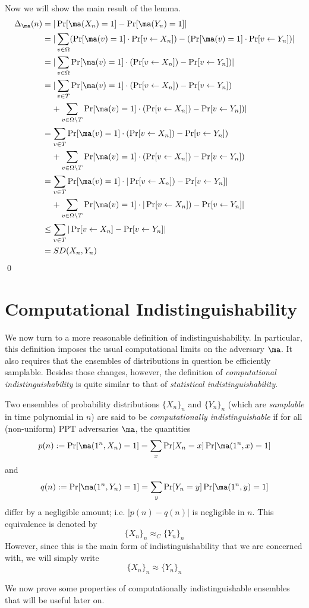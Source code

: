 Now we will show the main result of the lemma.
\begin{align*}
    \Delta_\ma(n) &= |\Pr[\ma(X_n) = 1] - \Pr[\ma(Y_n) = 1]| \\
    &= |\sum\limits_{v \in \Omega} (\Pr[\ma(v) = 1] \cdot \Pr[v \leftarrow X_n]) - (\Pr[\ma(v) = 1] \cdot \Pr[v \leftarrow Y_n])|\\
    &= |\sum\limits_{v \in \Omega} \Pr[\ma(v) = 1] \cdot ( \Pr[v \leftarrow X_n]) - \Pr[v \leftarrow Y_n])| \\
    &= |\sum\limits_{v \in T} \Pr[\ma(v) = 1] \cdot ( \Pr[v \leftarrow X_n]) - \Pr[v \leftarrow Y_n]) \\
    &\;\;\;\; + \sum\limits_{v \in \Omega \setminus T} \Pr[\ma(v) = 1] \cdot ( \Pr[v \leftarrow X_n]) - \Pr[v \leftarrow Y_n])| \\
    &= \sum\limits_{v \in T} \Pr[\ma(v) = 1] \cdot ( \Pr[v \leftarrow X_n]) - \Pr[v \leftarrow Y_n]) \\
    &\;\;\;\; + \sum\limits_{v \in \Omega \setminus T} \Pr[\ma(v) = 1] \cdot ( \Pr[v \leftarrow X_n]) - \Pr[v \leftarrow Y_n]) \\
    &= \sum\limits_{v \in T} \Pr[\ma(v) = 1] \cdot |\Pr[v \leftarrow X_n]) - \Pr[v \leftarrow Y_n]| \\
    &\;\;\;\; + \sum\limits_{v \in \Omega \setminus T} \Pr[\ma(v) = 1] \cdot |\Pr[v \leftarrow X_n]) - \Pr[v \leftarrow Y_n]| \\
    &\le \sum\limits_{v \in T} |\Pr[v \leftarrow X_n] - \Pr[v \leftarrow Y_n]|\\
    &= SD(X_n, Y_n)
\end{align*}
\qed

\section{Computational Indistinguishability}
We now turn to a more reasonable definition of indistinguishability.
In particular, this definition imposes the usual computational limits on the adversary $\ma$. 
It also requires that the ensembles of distributions in question be efficiently samplable.
Besides those changes, however, the definition of \emph{computational indistinguishability} is quite similar to that of \emph{statistical indistinguishability}.

\begin{definition}
Two ensembles of probability distributions $\{X_n\}_n$ and $\{Y_n\}_n$ (which are \emph{samplable} in time polynomial in $n$) are said to be \emph{computationally indistinguishable} if for all (non-uniform) PPT adversaries $\ma$, the quantities
$$p(n) := \Pr[\ma(1^n, X_n) = 1] = \sum_x \Pr[X_n = x]\Pr[\ma(1^n,x) = 1]$$
and
$$q(n) := \Pr[\ma(1^n,Y_n) = 1] = \sum_y \Pr[Y_n = y]\Pr[\ma(1^n,y) = 1]$$
differ by a negligible amount; i.e. $|p(n) - q(n)|$ is negligible in $n$.    
This equivalence is denoted by
$$\{X_n\}_n\approx_C \{Y_n\}_n$$
However, since this is the main form of indistinguishability that we are concerned with, we will simply write
$$\{X_n\}_n\approx \{Y_n\}_n$$
\end{definition}
We now prove some properties of computationally indistinguishable ensembles that will be useful later on.

